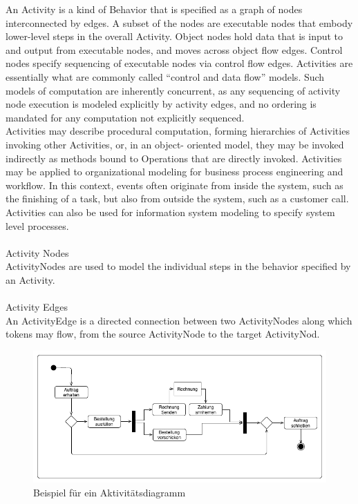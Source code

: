 \glqq An Activity is a kind of Behavior that is specified as a graph of nodes interconnected by edges. A subset of the nodes are executable nodes that embody lower-level steps in the overall Activity. Object nodes hold data that is input to and output from executable nodes, and moves across object flow edges. Control nodes specify sequencing of executable nodes via control flow edges. Activities are essentially what are commonly called “control and data flow” models. Such models of computation are inherently concurrent, as any sequencing of activity node execution is modeled explicitly by activity edges, and no ordering is mandated for any computation not explicitly sequenced.\\
Activities may describe procedural computation, forming hierarchies of Activities invoking other Activities, or, in an object- oriented model, they may be invoked indirectly as methods bound to Operations that are directly invoked. Activities may be applied to organizational modeling for business process engineering and workflow. In this context, events often originate from inside the system, such as the finishing of a task, but also from outside the system, such as a customer call. Activities can also be used for information system modeling to specify system level processes.\\
\\
Activity Nodes\\
ActivityNodes are used to model the individual steps in the behavior specified by an Activity.\\
\\
Activity Edges\\
An ActivityEdge is a directed connection between two ActivityNodes along which tokens may flow, from the source ActivityNode to the target ActivityNod.\grqq \cite{uml_def} \\

\begin{figure}[hbt!]
 \centering
  \includegraphics[width=1\textwidth]{graphics/stateoftheart/Activity_bsp}
  \caption{Beispiel für ein Aktivitätsdiagramm \cite{activity_example}}
\end{figure}
 
